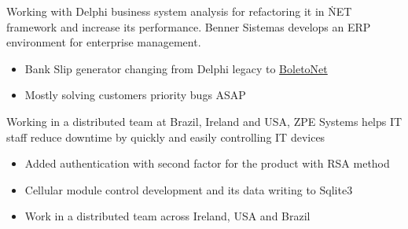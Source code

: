 \documentclass[10pt,a4paper]{altacv}
\begin{document}

\begin{fullwidth}

	\makecvheader{}

\end{fullwidth}


Working with Delphi business system analysis for refactoring it in \.NET framework and increase its performance. Benner Sistemas develops an ERP environment for enterprise management.
\begin{itemize}
\item Bank Slip generator changing from Delphi legacy to \href{https://github.com/BoletoNet/boletonet}{BoletoNet}
\item Mostly solving customers priority bugs ASAP
\end{itemize}

\divider{}

Working in a distributed team at Brazil, Ireland and USA, ZPE Systems helps IT staff reduce downtime by quickly and easily controlling IT devices
\begin{itemize}
\item Added authentication with second factor for the product with RSA method
\item Cellular module control development and its data writing to Sqlite3
\item Work in a distributed team across Ireland, USA and Brazil
\end{itemize}
\end{document}
